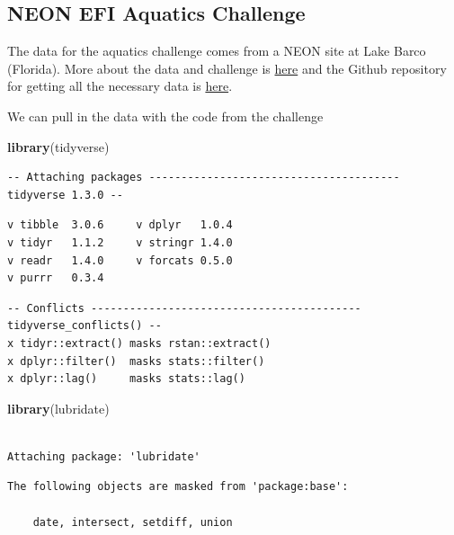 \documentclass[
]{article}
\newenvironment{Shaded}{\begin{snugshade}}{\end{snugshade}}
\newcommand{\KeywordTok}[1]{\textcolor[rgb]{0.13,0.29,0.53}{\textbf{#1}}}
\newcommand{\NormalTok}[1]{#1}
\begin{document}
\hypertarget{sec-neon-data}{%
\subsection{NEON EFI Aquatics Challenge}\label{sec-neon-data}}

The data for the aquatics challenge comes from a NEON site at Lake Barco
(Florida). More about the data and challenge is
\href{https://ecoforecast.org/efi-rcn-forecast-challenges/}{here} and
the Github repository for getting all the necessary data is
\href{https://github.com/eco4cast/neon4cast-aquatics}{here}.

We can pull in the data with the code from the challenge

\begin{Shaded}
\begin{Highlighting}[]
\KeywordTok{library}\NormalTok{(tidyverse)}
\end{Highlighting}
\end{Shaded}

\begin{verbatim}
-- Attaching packages --------------------------------------- tidyverse 1.3.0 --
\end{verbatim}

\begin{verbatim}
v tibble  3.0.6     v dplyr   1.0.4
v tidyr   1.1.2     v stringr 1.4.0
v readr   1.4.0     v forcats 0.5.0
v purrr   0.3.4     
\end{verbatim}

\begin{verbatim}
-- Conflicts ------------------------------------------ tidyverse_conflicts() --
x tidyr::extract() masks rstan::extract()
x dplyr::filter()  masks stats::filter()
x dplyr::lag()     masks stats::lag()
\end{verbatim}

\begin{Shaded}
\begin{Highlighting}[]
\KeywordTok{library}\NormalTok{(lubridate)}
\end{Highlighting}
\end{Shaded}

\begin{verbatim}

Attaching package: 'lubridate'
\end{verbatim}

\begin{verbatim}
The following objects are masked from 'package:base':

    date, intersect, setdiff, union
\end{verbatim}
\end{document}
